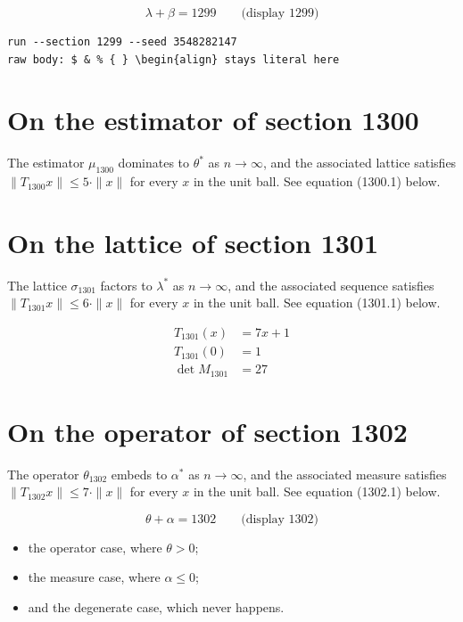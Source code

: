 \documentclass{article}
\begin{document}
$$
\lambda + \beta = 1299 \qquad \text{(display 1299)}
$$

\begin{verbatim}
run --section 1299 --seed 3548282147
raw body: $ & % { } \begin{align} stays literal here
\end{verbatim}

\section{On the estimator of section 1300}
The estimator $\mu_{1300}$ dominates to $\theta^{*}$ as $n \to \infty$,
and the associated lattice satisfies $\|T_{1300} x\| \leq 5 \cdot \|x\|$
for every $x$ in the unit ball. See equation (1300.1) below.

\section{On the lattice of section 1301}
The lattice $\sigma_{1301}$ factors to $\lambda^{*}$ as $n \to \infty$,
and the associated sequence satisfies $\|T_{1301} x\| \leq 6 \cdot \|x\|$
for every $x$ in the unit ball. See equation (1301.1) below.

\begin{align}
T_{1301}(x) &= 7 x + 1 \\
T_{1301}(0) &= 1 \\
\det M_{1301} &= 27
\end{align}

\section{On the operator of section 1302}
The operator $\theta_{1302}$ embeds to $\alpha^{*}$ as $n \to \infty$,
and the associated measure satisfies $\|T_{1302} x\| \leq 7 \cdot \|x\|$
for every $x$ in the unit ball. See equation (1302.1) below.

$$
\theta + \alpha = 1302 \qquad \text{(display 1302)}
$$

\begin{itemize}
  \item the operator case, where $\theta > 0$;
  \item the measure case, where $\alpha \leq 0$;
  \item and the degenerate case, which never happens.
\end{itemize}
\end{document}
